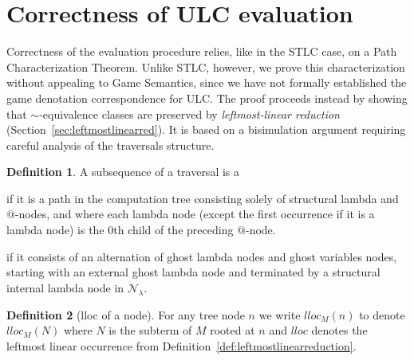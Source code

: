 \documentclass{elsarticle}
\makeatletter
\theoremstyle{plain}
\theoremstyle{definition}
\newtheorem{definition}{Definition}[section]
\theoremstyle{remark}
\newcommand\Nodes{\mathcal{N}}%
\newcommand\NodesLmd{\Nodes_\lambda}%
\renewcommand\ie{{\it i.e.\@\xspace}}
\makeatother
\begin{document}
\section{Correctness of ULC evaluation}
\label{sec:correctness_ulc_normalization}
Correctness of the evaluation procedure relies, like in the STLC case, on a Path Characterization Theorem.
Unlike STLC, however, we prove this characterization without appealing to Game Semantics, since we have not formally established the game denotation correspondence for ULC.
The proof proceeds instead by showing that $\sim$-equivalence classes are preserved by \emph{leftmost-linear reduction} (Section~\ref{sec:leftmostlinearred}). It is based on a bisimulation argument requiring careful analysis of the traversals structure.


\begin{definition}
    \label{def:spinaldescent_pendingarglookup}
A subsequence of a traversal is a
\begin{enumerate*}[nosep,label=(\roman*)]
\item {} if it is a path in the computation tree consisting solely of structural lambda and $@$-nodes, and where each lambda node (except the first occurrence if it is a lambda node) is the $0$th child of the preceding $@$-node.
\item {} if it consists of an alternation of ghost lambda nodes and ghost variables nodes, starting with an external ghost lambda node and terminated by a structural internal lambda node in $\NodesLmd$.
\end{enumerate*}
\end{definition}

\begin{definition}[lloc of a node]
For any tree node $n$ we write $lloc_M(n)$ to denote $lloc_M(N)$ where $N$ is the subterm of $M$ rooted at $n$ and $lloc$ denotes the leftmost linear occurrence from Definition~\ref{def:leftmostlinearreduction}.
\end{definition}
\end{document}
